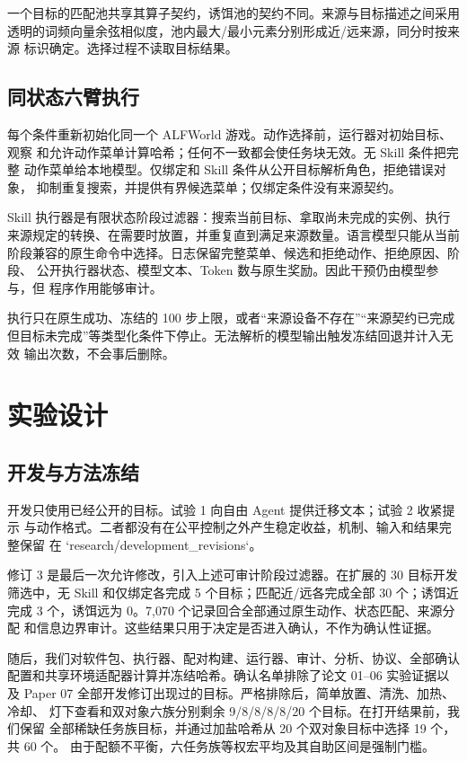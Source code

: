 \documentclass[10pt]{article}
\begin{document}
一个目标的匹配池共享其算子契约，诱饵池的契约不同。来源与目标描述之间采用
透明的词频向量余弦相似度，池内最大/最小元素分别形成近/远来源，同分时按来源
标识确定。选择过程不读取目标结果。

\subsection{同状态六臂执行}
每个条件重新初始化同一个 ALFWorld 游戏。动作选择前，运行器对初始目标、观察
和允许动作菜单计算哈希；任何不一致都会使任务块无效。无 Skill 条件把完整
动作菜单给本地模型。仅绑定和 Skill 条件从公开目标解析角色，拒绝错误对象，
抑制重复搜索，并提供有界候选菜单；仅绑定条件没有来源契约。

Skill 执行器是有限状态阶段过滤器：搜索当前目标、拿取尚未完成的实例、执行
来源规定的转换、在需要时放置，并重复直到满足来源数量。语言模型只能从当前
阶段兼容的原生命令中选择。日志保留完整菜单、候选和拒绝动作、拒绝原因、阶段、
公开执行器状态、模型文本、Token 数与原生奖励。因此干预仍由模型参与，但
程序作用能够审计。

执行只在原生成功、冻结的 100 步上限，或者“来源设备不存在”“来源契约已完成
但目标未完成”等类型化条件下停止。无法解析的模型输出触发冻结回退并计入无效
输出次数，不会事后删除。

\section{实验设计}
\subsection{开发与方法冻结}
开发只使用已经公开的目标。试验 1 向自由 Agent 提供迁移文本；试验 2 收紧提示
与动作格式。二者都没有在公平控制之外产生稳定收益，机制、输入和结果完整保留
在 `research/development\_revisions`。

修订 3 是最后一次允许修改，引入上述可审计阶段过滤器。在扩展的 30 目标开发
筛选中，无 Skill 和仅绑定各完成 5 个目标；匹配近/远各完成全部 30 个；诱饵近
完成 3 个，诱饵远为 0。7,070 个记录回合全部通过原生动作、状态匹配、来源分配
和信息边界审计。这些结果只用于决定是否进入确认，不作为确认性证据。

随后，我们对软件包、执行器、配对构建、运行器、审计、分析、协议、全部确认
配置和共享环境适配器计算并冻结哈希。确认名单排除了论文 01--06 实验证据以及
Paper 07 全部开发修订出现过的目标。严格排除后，简单放置、清洗、加热、冷却、
灯下查看和双对象六族分别剩余 9/8/8/8/8/20 个目标。在打开结果前，我们保留
全部稀缺任务族目标，并通过加盐哈希从 20 个双对象目标中选择 19 个，共 60 个。
由于配额不平衡，六任务族等权宏平均及其自助区间是强制门槛。
\end{document}
